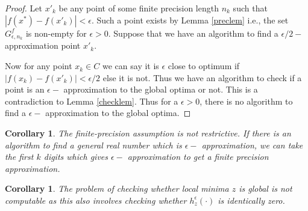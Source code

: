 \documentclass[a4paper,11pt]{article}
\newtheorem{corollary}[theorem]{Corollary}
\theoremstyle{definition}
\theoremstyle{remark}
\begin{document}
		\begin{proof}
		Let $x'_k$ be any point of some finite precision length $n_k$ such that $|f(x^*)-f(x'_k)| < \epsilon$. Such a point exists by Lemma \ref{preclem} i.e., the set $G^f_{\epsilon,n_k}$ is non-empty for $\epsilon > 0$. Suppose that we have an algorithm to find a $\epsilon/2-$ approximation point $x'_k$.%

		Now for any point $x_k \in C$ we can say it is $\epsilon$ close to optimum if $|f(x_k)-f(x'_k)| < \epsilon/2$ else it is not. Thus we have an algorithm to check if a point is an $\epsilon-$ approximation to the global optima or not. This is a contradiction to Lemma \ref{checklem}. Thus for a $\epsilon > 0$, there is no algorithm to find a $\epsilon-$ approximation to the global optima. 
		
	\end{proof}
	
	\begin{corollary}
		The finite-precision assumption is not restrictive. If there is an algorithm to find a general real number which is $\epsilon-$ approximation, we can take the first $k$ digits which gives $\epsilon-$ approximation to get a finite precision approximation. %
	\end{corollary}
	
	
	\begin{corollary}
		The problem of checking whether local minima $z$ is global is not computable as this also involves checking whether $h_z^{\epsilon}(\cdot)$ is identically zero.
	\end{corollary}
	
\end{document}
